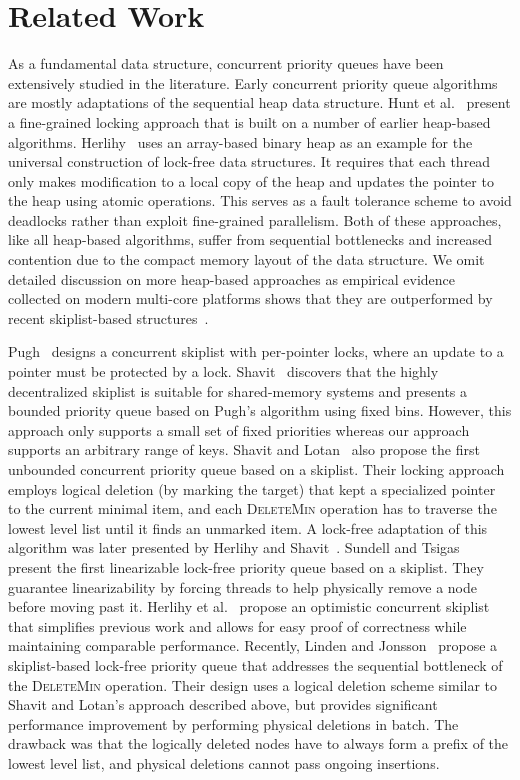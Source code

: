 \documentclass[10pt,journal,letterpaper,compsoc]{IEEEtran}
\begin{document}
\section{Related Work}
\label{sec:related}
As a fundamental data structure, concurrent priority queues have been extensively studied in the literature.
Early concurrent priority queue algorithms are mostly adaptations of the sequential heap data structure.
Hunt et al.~\cite{hunt1996efficient} present a fine-grained locking approach that is built on a number of earlier heap-based algorithms.
Herlihy~\cite{herlihy1993methodology} uses an array-based binary heap as an example for the universal construction of lock-free data structures.
It requires that each thread only makes modification to a local copy of the heap and updates the pointer to the heap using atomic operations.
This serves as a fault tolerance scheme to avoid deadlocks rather than exploit fine-grained parallelism.
Both of these approaches, like all heap-based algorithms, suffer from sequential bottlenecks and increased contention due to the compact memory layout of the data structure.
We omit detailed discussion on more heap-based approaches as empirical evidence collected on modern multi-core platforms shows that they are outperformed by recent skiplist-based structures~\cite{shavit2000skiplist,sundell2005fast}.

Pugh~\cite{pugh1990concurrent} designs a concurrent skiplist with per-pointer locks, where an update to a pointer must be protected by a lock. 
Shavit~\cite{shavit1999scalable} discovers that the highly decentralized skiplist is suitable for shared-memory systems and presents a bounded priority queue based on Pugh's algorithm using fixed bins. 
However, this approach only supports a small set of fixed priorities whereas our approach supports an arbitrary range of keys.
Shavit and Lotan~\cite{shavit2000skiplist} also propose the first unbounded concurrent priority queue based on a skiplist.
Their locking approach employs logical deletion (by marking the target) that kept a specialized pointer to the current minimal item, and each \textsc{DeleteMin} operation has to traverse the lowest level list until it finds an unmarked item.
A lock-free adaptation of this algorithm was later presented by Herlihy and Shavit~\cite{herlihy2012art}.
Sundell and Tsigas~\cite{sundell2005fast} present the first linearizable lock-free priority queue based on a skiplist.
They guarantee linearizability by forcing threads to help physically remove a node before moving past it.
Herlihy et al.~\cite{herlihy2006provably} propose an optimistic concurrent skiplist that simplifies previous work and allows for easy proof of correctness while maintaining comparable performance.
Recently, Linden and Jonsson~\cite{linden2013skiplist} propose a skiplist-based lock-free priority queue that addresses the sequential bottleneck of the \textsc{DeleteMin} operation.
Their design uses a logical deletion scheme similar to Shavit and Lotan's approach described above, but provides significant performance improvement by performing physical deletions in batch. 
The drawback was that the logically deleted nodes have to always form a prefix of the lowest level list, and physical deletions cannot pass ongoing insertions.
\end{document}
